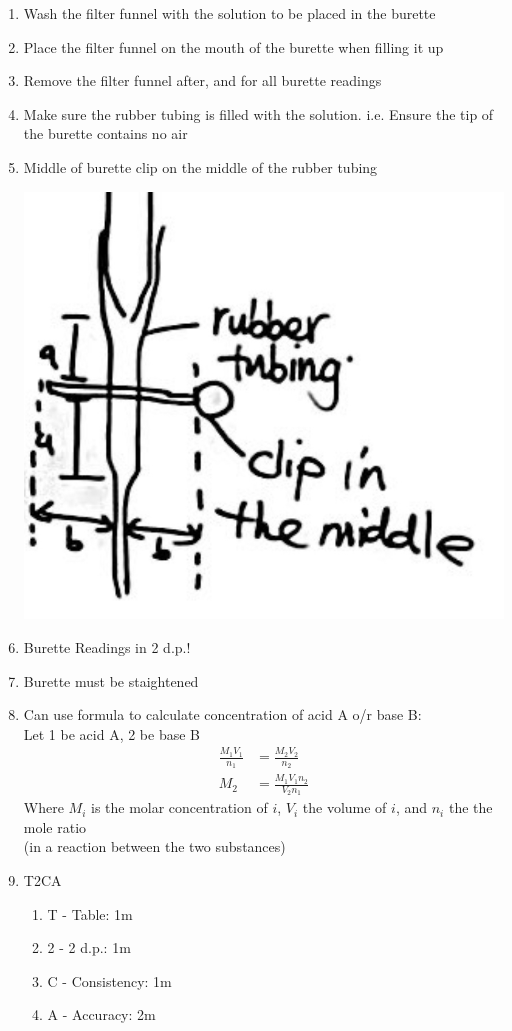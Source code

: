 \documentclass[oneside]{book}
\begin{document}
\begin{enumerate}
    \item Wash the filter funnel with the solution to be placed in the burette 
    \item Place the filter funnel on the mouth of the burette when filling it up
    \item Remove the filter funnel after, and for all burette readings
    \item Make sure the rubber tubing is filled with the solution. i.e. Ensure the tip of the burette contains no air
    \item Middle of burette clip on the middle of the rubber tubing\\
    \begin{center}
    \includegraphics[scale=0.15]{images/D069C095-EBB8-4D96-A373-21AD011DD588.jpeg}
    \end{center}
    \item Burette Readings in 2 d.p.!
    \item Burette must be staightened
    \item Can use formula to calculate concentration of acid A o/r base B:\\
    Let 1 be acid A, 2 be base B
    \begin{align*}
        \frac{M_1 V_1}{n_1} &= \frac{M_2 V_2}{n_2}\\
        M_2 &= \frac{M_1 V_1 n_2}{V_2 n_1}
    \end{align*}
    Where \(M_i\) is the molar concentration of \(i\), \(V_i\) the volume of \(i\), and \(n_i\) the the mole ratio\\
    \footnotesize (in a reaction between the two substances) \normalsize
    \item T2CA
    \begin{enumerate}
        \item T - Table: 1m
        \item 2 - 2 d.p.: 1m 
        \item C - Consistency: 1m
        \item A - Accuracy: 2m
    \end{enumerate}
\end{enumerate}
\end{document}
